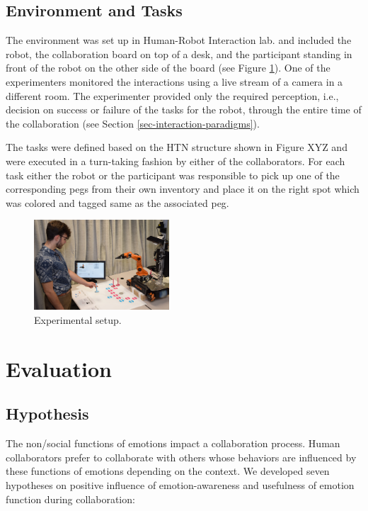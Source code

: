\documentclass{sig-alternate-05-2015}
\begin{document}
\subsection{Environment and Tasks}

The environment was set up in Human-Robot Interaction lab. and included the
robot, the collaboration board on top of a desk, and the participant standing in
front of the robot on the other side of the board (see Figure
\ref{fig:environment}). One of the experimenters monitored the interactions
using a live stream of a camera in a different room. The experimenter provided
only the required perception, i.e., decision on success or failure of the tasks
for the robot, through the entire time of the collaboration (see Section
\ref{sec-interaction-paradigms}).

The tasks were defined based on the HTN structure shown in Figure XYZ and were
executed in a turn-taking fashion by either of the collaborators. For each task
either the robot or the participant was responsible to pick up one of the
corresponding pegs from their own inventory and place it on the right spot which
was colored and tagged same as the associated peg.

\begin{figure}
  \centering
  \includegraphics[width=0.45\textwidth]{figure/environment.png}
  \caption{{\fontsize{9}{9}\selectfont Experimental setup.}}
  \label{fig:environment}
\end{figure}

\section{Evaluation}

\subsection{Hypothesis}

The non/social functions of emotions impact a collaboration process. Human
collaborators prefer to collaborate with others whose behaviors are influenced
by these functions of emotions depending on the context. We developed seven
hypotheses on positive influence of emotion-awareness and usefulness of emotion
function during collaboration:
\end{document}
